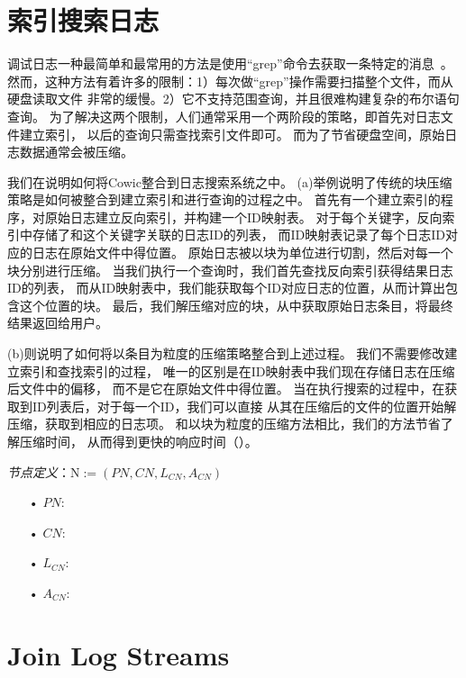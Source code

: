 \section{索引搜索日志}

调试日志一种最简单和最常用的方法是使用``grep''命令去获取一条特定的消息~\cite{Oliner2012}。
然而，这种方法有着许多的限制：1）每次做``grep''操作需要扫描整个文件，而从硬盘读取文件
非常的缓慢。2）它不支持范围查询，并且很难构建复杂的布尔语句查询。
为了解决这两个限制，人们通常采用一个两阶段的策略，即首先对日志文件建立索引，
以后的查询只需查找索引文件即可。
而为了节省硬盘空间，原始日志数据通常会被压缩。

我们在说明如何将Cowic整合到日志搜索系统之中。
(a)举例说明了传统的块压缩策略是如何被整合到建立索引和进行查询的过程之中。
首先有一个建立索引的程序，对原始日志建立反向索引，并构建一个ID映射表。
对于每个关键字，反向索引中存储了和这个关键字关联的日志ID的列表，
而ID映射表记录了每个日志ID对应的日志在原始文件中得位置。
原始日志被以块为单位进行切割，然后对每一个块分别进行压缩。
当我们执行一个查询时，我们首先查找反向索引获得结果日志ID的列表，
而从ID映射表中，我们能获取每个ID对应日志的位置，从而计算出包含这个位置的块。
最后，我们解压缩对应的块，从中获取原始日志条目，将最终结果返回给用户。

(b)则说明了如何将以条目为粒度的压缩策略整合到上述过程。
我们不需要修改建立索引和查找索引的过程，
唯一的区别是在ID映射表中我们现在存储日志在压缩后文件中的偏移，
而不是它在原始文件中得位置。
当在执行搜索的过程中，在获取到ID列表后，对于每一个ID，我们可以直接
从其在压缩后的文件的位置开始解压缩，获取到相应的日志项。
和以块为粒度的压缩方法相比，我们的方法节省了解压缩时间，
从而得到更快的响应时间（）。

\textit{节点定义}：$\mathrm{N} := (PN, CN, L_{CN}, A_{CN})$
\begin{enumerate}
\item[•] $PN$:
\item[•] $CN$:
\item[•] $L_{CN}$:
\item[•] $A_{CN}$:
\end{enumerate}

\section{Join Log Streams}


